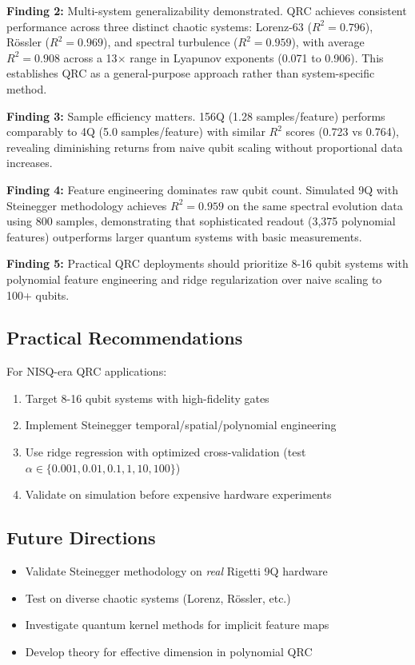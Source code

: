 \documentclass[conference]{IEEEtran}
\begin{document}
\textbf{Finding 2:} Multi-system generalizability demonstrated. QRC achieves consistent performance across three distinct chaotic systems: Lorenz-63 ($R^2=0.796$), Rössler ($R^2=0.969$), and spectral turbulence ($R^2=0.959$), with average $R^2=0.908$ across a 13$\times$ range in Lyapunov exponents (0.071 to 0.906). This establishes QRC as a general-purpose approach rather than system-specific method.

\textbf{Finding 3:} Sample efficiency matters. 156Q (1.28 samples/feature) performs comparably to 4Q (5.0 samples/feature) with similar $R^2$ scores (0.723 vs 0.764), revealing diminishing returns from naive qubit scaling without proportional data increases.

\textbf{Finding 4:} Feature engineering dominates raw qubit count. Simulated 9Q with Steinegger methodology achieves $R^2=0.959$ on the same spectral evolution data using 800 samples, demonstrating that sophisticated readout (3,375 polynomial features) outperforms larger quantum systems with basic measurements.

\textbf{Finding 5:} Practical QRC deployments should prioritize 8-16 qubit systems with polynomial feature engineering and ridge regularization over naive scaling to 100+ qubits.

\subsection{Practical Recommendations}

For NISQ-era QRC applications:

\begin{enumerate}
    \item Target 8-16 qubit systems with high-fidelity gates
    \item Implement Steinegger temporal/spatial/polynomial engineering
    \item Use ridge regression with optimized cross-validation (test $\alpha \in \{0.001, 0.01, 0.1, 1, 10, 100\}$)
    \item Validate on simulation before expensive hardware experiments
\end{enumerate}

\subsection{Future Directions}

\begin{itemize}
    \item Validate Steinegger methodology on \textit{real} Rigetti 9Q hardware
    \item Test on diverse chaotic systems (Lorenz, Rössler, etc.)
    \item Investigate quantum kernel methods for implicit feature maps
    \item Develop theory for effective dimension in polynomial QRC
\end{itemize}
\end{document}
